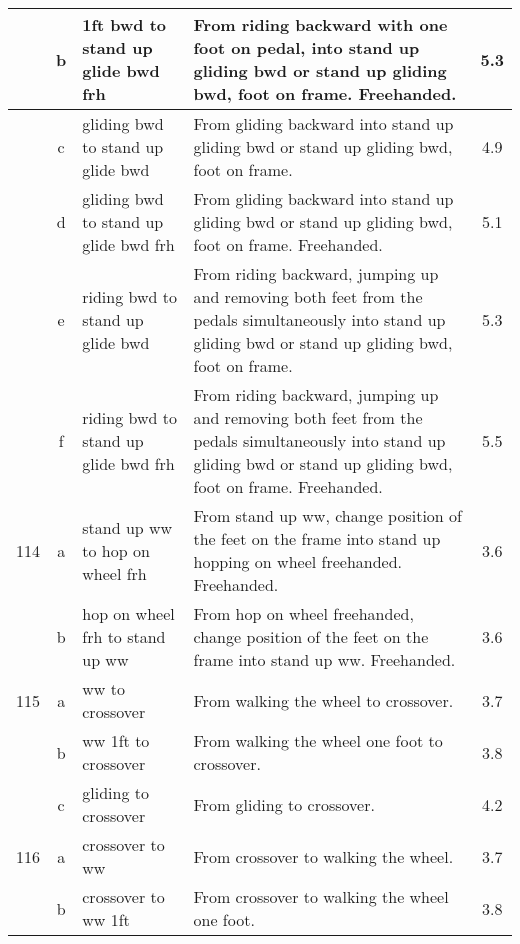 \begin{longtable}{|r|c|p{4cm}|p{8cm}|c|}
\hline
  & b & 1ft bwd to stand up glide bwd frh & From riding backward with one foot on pedal, into stand up gliding bwd or stand up gliding bwd, foot on frame. Freehanded.  & 5.3 \\ 
\hline
  & c & gliding bwd to stand up glide bwd & From gliding backward into stand up gliding bwd or stand up gliding bwd, foot on frame. & 4.9 \\ 
\hline
  & d & gliding bwd to stand up glide bwd frh & From gliding backward into stand up gliding bwd or stand up gliding bwd, foot on frame. Freehanded. & 5.1 \\ 
\hline
  & e & riding bwd to stand up glide bwd  & From riding backward, jumping up and removing both feet from the pedals simultaneously into stand up gliding bwd or stand up gliding bwd, foot on frame.  & 5.3 \\ 
\hline
  & f & riding bwd to stand up glide bwd frh  & From riding backward, jumping up and removing both feet from the pedals simultaneously into stand up gliding bwd or stand up gliding bwd, foot on frame. Freehanded.  & 5.5 \\ 
\hline
114 & a & stand up ww to hop on wheel frh & From stand up ww, change position of the feet on the frame into stand up hopping on wheel freehanded. Freehanded. & 3.6 \\ 
\hline
  & b & hop on wheel frh to stand up ww & From hop on wheel freehanded, change position of the feet on the frame into stand up ww. Freehanded.  & 3.6 \\ 
\hline
115 & a & ww to crossover & From walking the wheel to crossover.  & 3.7 \\ 
\hline
  & b & ww 1ft to crossover & From walking the wheel one foot to crossover. & 3.8 \\ 
\hline
  & c & gliding to crossover  & From gliding to crossover.  & 4.2 \\ 
\hline
116 & a & crossover to ww & From crossover to walking the wheel.  & 3.7 \\ 
\hline
  & b & crossover to ww 1ft & From crossover to walking the wheel one foot. & 3.8 \\ 
\hline
\end{longtable}
\newpage

